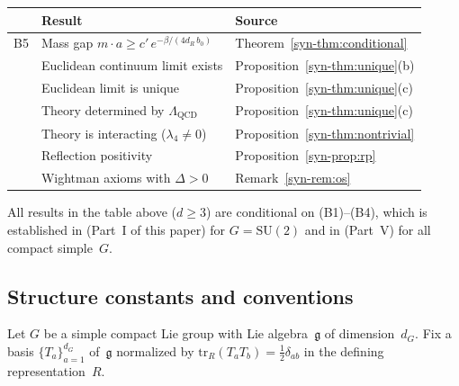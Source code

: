 \documentclass[11pt]{article}
\theoremstyle{definition}
\newcommand{\SU}{\mathrm{SU}}
\newcommand{\tr}{\mathrm{tr}}
\newcommand{\fg}{\mathfrak{g}}
\begin{document}
\begin{center}
\renewcommand{\arraystretch}{1.3}
\begin{tabular}{@{}cll@{}}
\toprule
& \textbf{Result} & \textbf{Source} \\
\midrule
B5 & Mass gap $m \cdot a \geq c'\,e^{-\beta/(4d_R\,b_0)}$
  & Theorem~\ref{syn-thm:conditional} \\
& Euclidean continuum limit exists
  & Proposition~\ref{syn-thm:unique}(b) \\
& Euclidean limit is unique
  & Proposition~\ref{syn-thm:unique}(c) \\
& Theory determined by $\Lambda_{\mathrm{QCD}}$
  & Proposition~\ref{syn-thm:unique}(c) \\
& Theory is interacting ($\lambda_4 \neq 0$)
  & Proposition~\ref{syn-thm:nontrivial} \\
& Reflection positivity
  & Proposition~\ref{syn-prop:rp} \\
& Wightman axioms with $\Delta > 0$
  & Remark~\ref{syn-rem:os} \\
\bottomrule
\end{tabular}
\end{center}

\noindent
All results in the table above ($d \geq 3$) are conditional
on (B1)--(B4), which is established in (Part~I of this paper)
for $G = \SU(2)$ and in (Part~V) for all compact
simple~$G$.





\subsection{Structure constants and conventions}

Let $G$ be a simple compact Lie group with Lie
algebra~$\fg$ of dimension~$d_G$.
Fix a basis $\{T_a\}_{a=1}^{d_G}$ of~$\fg$ normalized
by $\tr_R(T_a T_b)=\tfrac{1}{2}\delta_{ab}$ in the
defining representation~$R$.
\end{document}
